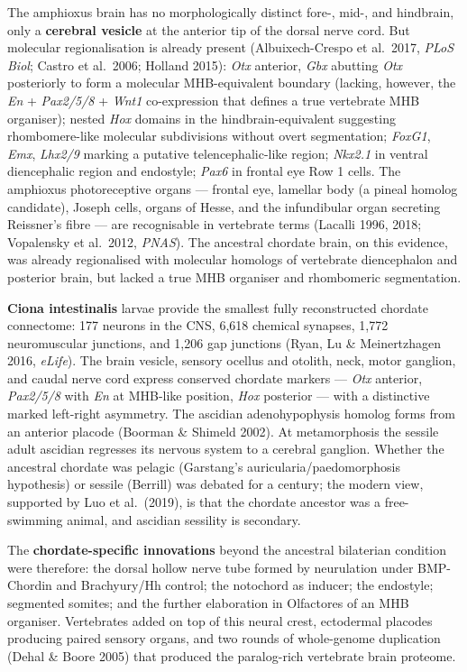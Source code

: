 The amphioxus brain has no morphologically distinct fore-, mid-, and hindbrain, only a \textbf{cerebral vesicle} at the anterior tip of the dorsal nerve cord. But molecular regionalisation is already present (Albuixech-Crespo et al.~2017, \emph{PLoS Biol}; Castro et al.~2006; Holland 2015): \emph{Otx} anterior, \emph{Gbx} abutting \emph{Otx} posteriorly to form a molecular MHB-equivalent boundary (lacking, however, the \emph{En} + \emph{Pax2/5/8} + \emph{Wnt1} co-expression that defines a true vertebrate MHB organiser); nested \emph{Hox} domains in the hindbrain-equivalent suggesting rhombomere-like molecular subdivisions without overt segmentation; \emph{FoxG1}, \emph{Emx}, \emph{Lhx2/9} marking a putative telencephalic-like region; \emph{Nkx2.1} in ventral diencephalic region and endostyle; \emph{Pax6} in frontal eye Row 1 cells. The amphioxus photoreceptive organs --- frontal eye, lamellar body (a pineal homolog candidate), Joseph cells, organs of Hesse, and the infundibular organ secreting Reissner's fibre --- are recognisable in vertebrate terms (Lacalli 1996, 2018; Vopalensky et al.~2012, \emph{PNAS}). The ancestral chordate brain, on this evidence, was already regionalised with molecular homologs of vertebrate diencephalon and posterior brain, but lacked a true MHB organiser and rhombomeric segmentation.

\textbf{Ciona intestinalis} larvae provide the smallest fully reconstructed chordate connectome: 177 neurons in the CNS, 6,618 chemical synapses, 1,772 neuromuscular junctions, and 1,206 gap junctions (Ryan, Lu \& Meinertzhagen 2016, \emph{eLife}). The brain vesicle, sensory ocellus and otolith, neck, motor ganglion, and caudal nerve cord express conserved chordate markers --- \emph{Otx} anterior, \emph{Pax2/5/8} with \emph{En} at MHB-like position, \emph{Hox} posterior --- with a distinctive marked left-right asymmetry. The ascidian adenohypophysis homolog forms from an anterior placode (Boorman \& Shimeld 2002). At metamorphosis the sessile adult ascidian regresses its nervous system to a cerebral ganglion. Whether the ancestral chordate was pelagic (Garstang's auricularia/paedomorphosis hypothesis) or sessile (Berrill) was debated for a century; the modern view, supported by Luo et al.~(2019), is that the chordate ancestor was a free-swimming animal, and ascidian sessility is secondary.

The \textbf{chordate-specific innovations} beyond the ancestral bilaterian condition were therefore: the dorsal hollow nerve tube formed by neurulation under BMP-Chordin and Brachyury/Hh control; the notochord as inducer; the endostyle; segmented somites; and the further elaboration in Olfactores of an MHB organiser. Vertebrates added on top of this neural crest, ectodermal placodes producing paired sensory organs, and two rounds of whole-genome duplication (Dehal \& Boore 2005) that produced the paralog-rich vertebrate brain proteome.

